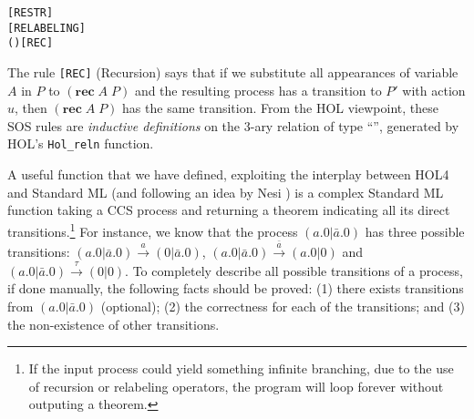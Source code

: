 \begin{alltt}
   \HOLSymConst{\ensuremath{\nu}}   \HOLTokenTransBegin{}\HOLTokenTransEnd \HOLSymConst{\ensuremath{\nu}}  \hfill\texttt{[RESTR]}
\HOLTokenTurnstile{}  \HOLTokenTransBegin{}\HOLTokenTransEnd {} \HOLSymConst{\HOLTokenImp{}}    \HOLTokenTransBegin{}  \HOLTokenTransEnd {}  \hfill\texttt{[RELABELING]}
\HOLTokenTurnstile{}   (  )  \HOLTokenTransBegin{}\HOLTokenTransEnd {} \HOLSymConst{\HOLTokenImp{}}    \HOLTokenTransBegin{}\HOLTokenTransEnd {}\hfill\texttt{[REC]}
\end{alltt}

The rule \texttt{[REC]} (Recursion)
 says that if we substitute all appearances of variable $A$ in $P$ to
$(\mathbf{rec}\; A\; P)$ and the resulting process has a transition to $P'$
with action $u$, then $(\mathbf{rec}\; A\; P)$ has the same
transition. From the HOL  viewpoint, these
SOS rules are \emph{inductive 
  definitions} on the 3-ary relation  of type ``'', generated by HOL's 
\texttt{Hol_reln} function.

A useful function that we have defined, exploiting the interplay
between HOL4 and Standard ML (and following an idea by Nesi \cite{Nesi:1992ve})
 is a complex Standard ML function
  taking a CCS process and returning a theorem indicating all its
  direct transitions.\footnote{If the input process could yield
    something infinite branching, due to the use of recursion or
    relabeling operators, the program will loop forever without
    outputing a theorem.}
For instance, we know that the process $(a.0 | \bar{a}.0)$ has three
possible transitions: $(a.0 | \bar{a}.0) \overset{a}{\longrightarrow}
(0 | \bar{a}.0)$, $(a.0 | \bar{a}.0)
\overset{\bar{a}}{\longrightarrow} (a.0 | 0)$ and $(a.0 | \bar{a}.0)
\overset{\tau}{\longrightarrow} (0 | 0)$.
To completely describe all possible transitions of a process, if done manually, the
following facts should be proved: (1) there exists transitions from
$(a.0 | \bar{a}.0)$ (optional); (2) the correctness for each of the
transitions; and (3) the non-existence of other transitions.

